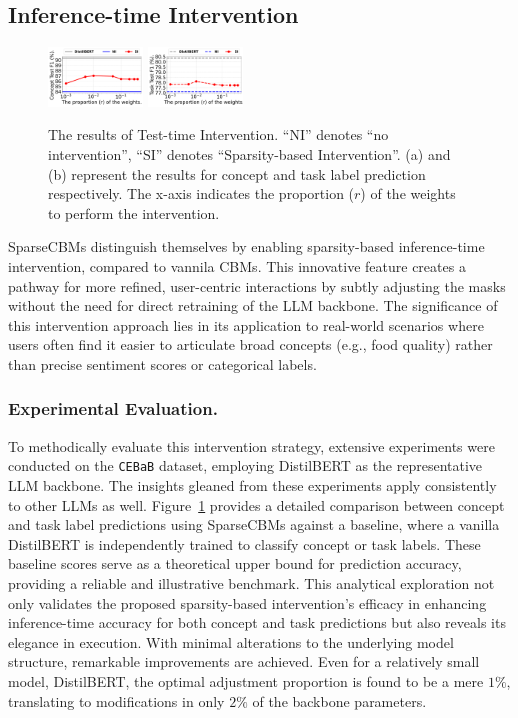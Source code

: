 \documentclass[letterpaper]{article} %
\begin{document}
\subsection{Inference-time Intervention}
\begin{figure}[b]
		\centering
\captionsetup[sub]{skip=-0.5pt}
{\includegraphics[width=0.225\textwidth]{img/intervene-cebab-concept.pdf}}
{\includegraphics[width=0.225\textwidth]{img/intervene-cebab-task.pdf}}
		\caption{The results of Test-time Intervention. ``NI'' denotes ``no intervention'', ``SI'' denotes ``Sparsity-based Intervention''. (a) and (b) represent the results for concept and task label prediction respectively. The x-axis indicates the proportion ($r$) of the weights to perform the intervention.}
		\label{fig:intervene}
	\end{figure}
SparseCBMs distinguish themselves by enabling sparsity-based inference-time intervention, compared to vannila CBMs. This innovative feature creates a pathway for more refined, user-centric interactions by subtly adjusting the masks without the need for direct retraining of the LLM backbone. The significance of this intervention approach lies in its application to real-world scenarios where users often find it easier to articulate broad concepts (e.g., food quality) rather than precise sentiment scores or categorical labels.

\subsubsection{Experimental Evaluation.}
To methodically evaluate this intervention strategy, extensive experiments were conducted on the \texttt{CEBaB} dataset, employing DistilBERT as the representative LLM backbone. The insights gleaned from these experiments apply consistently to other LLMs as well. Figure~\ref{fig:intervene} provides a detailed comparison between concept and task label predictions using SparseCBMs against a baseline, where a vanilla DistilBERT is independently trained to classify concept or task labels. These baseline scores serve as a theoretical upper bound for prediction accuracy, providing a reliable and illustrative benchmark.
This analytical exploration not only validates the proposed sparsity-based intervention's efficacy in enhancing inference-time accuracy for both concept and task predictions but also reveals its elegance in execution. With minimal alterations to the underlying model structure, remarkable improvements are achieved. Even for a relatively small model, DistilBERT, the optimal adjustment proportion is found to be a mere $1\%$, translating to modifications in only $2\%$ of the backbone parameters.
\end{document}
